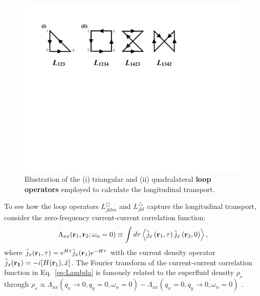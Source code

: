 \documentclass[amsmath,amssymb, aps, prx, longbibliography, twocolumn]{revtex4-1}
\begin{document}
\begin{figure}[b]
\includegraphics[scale=0.48]{LoopOperators.pdf}
\caption{
 Illustration of the (i) triangular and (ii) quadralateral {\bf loop operators} employed to calculate the longitudinal transport. 
}\label{fig:loops}
\end{figure}
To see how the loop operators $L^\Box_{jklm}$ and $ L^\triangle_{jkl}$ capture the longitudinal transport, consider the zero-frequency current-current correlation function:  
\begin{equation}
\Lambda_{xx}({\bf r}_1,{\bf r}_2;\omega_n=0)\equiv\int d\tau\left\langle \hat{j}_x\left({\bf r}_1, \tau \right) \hat{j}_x\left({\bf r}_2, 0 \right)\right\rangle,
\label{eq:Lambda}
\end{equation}
where $\hat{j}_x({\bf r}_1,\tau)=e^{H\tau} \hat{j}_x({\bf r}_1) e^{-H\tau}$ with the current density operator $\hat{j}_x({\bf r_1})= -i[H({\bf r}_1),\hat{x}]$. The Fourier transform of the 
current-current correlation function in Eq.~\eqref{eq:Lambda} is famously related to the superfluid density $\rho_s$ through $\rho_s\propto \Lambda_{xx}(q_x\!\rightarrow\! 0,q_y\!=\!0,\omega_n\!=\!0)-\Lambda_{xx}(q_x\!=\!0,q_y\!\rightarrow\!0,\omega_n\!=\!0)$ \cite{Scalapino1993, Scalapino1992}. 
\end{document}
